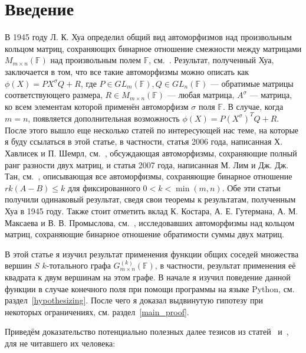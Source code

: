 \documentclass{article}
\begin{document}
\section{Введение}
В 1945 году Л. К. Хуа определил общий вид автоморфизмов над произвольным кольцом матриц, сохраняющих бинарное отношение смежности между матрицами $M_{m \times n}(\mathbb{F})$ над произвольным полем $\mathbb{F}$, см.~\cite{Hua}. Результат, полученный Хуа, заключается в том, что все такие автоморфизмы можно описать как $\phi(X) = PX^{\sigma}Q + R$, где $P \in GL_m(\mathbb{F}), Q \in GL_n(\mathbb{F})$ — обратимые матрицы соответствующего размера, $R \in M_{m \times n}(\mathbb{F})$ — любая матрица, $A^\sigma$ — матрица, ко всем элементам которой применён автоморфизм $\sigma$ поля $\mathbb{F}$. В случае, когда $m = n$, появляется дополнительная возможность $\phi(X) = P(X^{\sigma})^TQ + R$. После этого вышло еще несколько статей по интересующей нас теме, на которые я буду ссылаться в этой статье, в частности, статья 2006 года, написанная Х. Хавлисек и П. Шемрл, см.~\cite{art1}, обсуждающая автоморфизмы, сохраняющие полный ранг разности двух матриц, и статья 2007 года, написанная М. Лим и Дж. Дж. Тан, см.~\cite{art2}, описывающая все автоморфизмы, сохраняющие бинарное отношение $rk(A - B) \leq k$ для фиксированного $0 < k < \min(m, n)$. Обе эти статьи получили одинаковый результат, сведя свои теоремы к результатам, полученным Хуа в 1945 году. Также стоит отметить вклад К. Костара, А. Е. Гутермана, А. М. Максаева и В. В. Промыслова, см.~\cite{art3}, исследовавших автоморфизмы над кольцом матриц, сохраняющие бинарное отношение обратимости суммы двух матриц. 

В этой статье я изучил результат применения функции общих соседей множества вершин $S$ $k$-тотального графа $G_{m \times n}^{(k)}(\mathbb{F})$, в частности, результат применения её квадрата к двум вершинам на этом графе. В начале я изучил поведение данной функции в случае конечного поля при помощи программы на языке Python, см. раздел~\ref{hypothesizing}. После чего я доказал выдвинутую гипотезу при некоторых ограничениях, см. раздел~\ref{main_proof}.

Приведём доказательство потенциально полезных далее тезисов из статей~\cite{art1} и~\cite{art2}, для не читавшего их человека:
\end{document}
